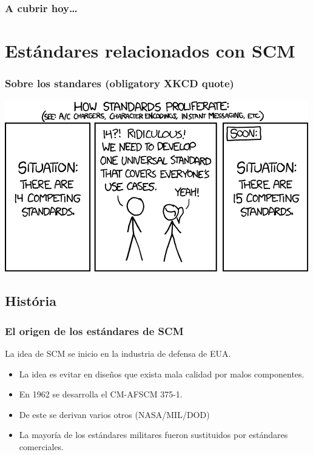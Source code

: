 \theoremstyle{definition}
\newtheorem{definicion}{Definici\'on}

\begin{frame}
\titlepage
\end{frame}

\begin{frame}
\frametitle{A cubrir hoy\ldots}
\tableofcontents
\end{frame}
\section{Est\'andares relacionados con SCM}
\begin{frame}
	\frametitle{Sobre los standares (obligatory XKCD quote)}
	\includegraphics[scale=0.3]{standards.png}
\end{frame}
\subsection{Hist\'oria}
\begin{frame}
	\frametitle{El origen de los est\'andares de SCM}
	La idea de SCM se inicio en la industria de defensa de EUA. 
	\begin{itemize}
		\item La idea es evitar en dise\~nos que exista mala 
			calidad por malos componentes.
		\item En 1962 se desarrolla el CM-AFSCM 375-1. 
		\item De este se derivan varios otros (NASA/MIL/DOD)
		\item La mayor\'ia de los est\'andares militares fueron 
			sustituidos por est\'andares comerciales. 
        \end{itemize}
\end{frame}
